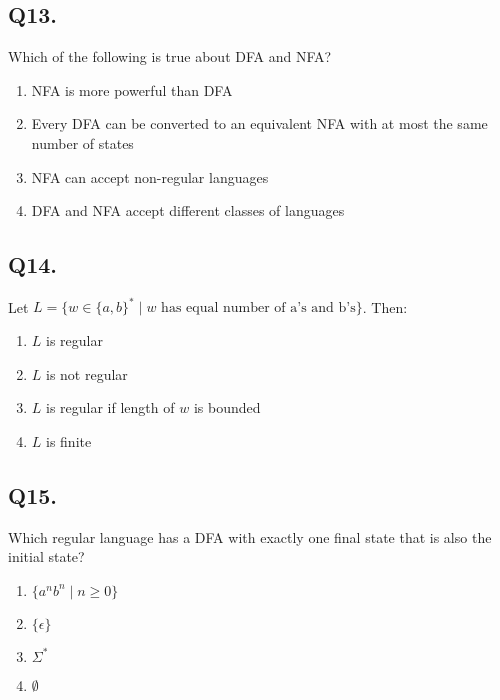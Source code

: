 \vspace{1em}

\subsection*{Q13.}
Which of the following is true about DFA and NFA?

\begin{enumerate}[label=(\alph*)]
    \item NFA is more powerful than DFA  
    \item Every DFA can be converted to an equivalent NFA with at most the same number of states  
    \item NFA can accept non-regular languages  
    \item DFA and NFA accept different classes of languages  
\end{enumerate}

\vspace{1em}

\subsection*{Q14.}
Let $L = \{w \in \{a, b\}^* \mid w \text{ has equal number of a's and b's} \}$. Then:

\begin{enumerate}[label=(\alph*)]
    \item $L$ is regular  
    \item $L$ is not regular  
    \item $L$ is regular if length of $w$ is bounded  
    \item $L$ is finite  
\end{enumerate}

\vspace{1em}

\subsection*{Q15.}
Which regular language has a DFA with exactly one final state that is also the initial state?

\begin{enumerate}[label=(\alph*)]
    \item $\{a^n b^n \mid n \geq 0\}$  
    \item $\{\epsilon\}$  
    \item $\Sigma^*$  
    \item $\emptyset$  
\end{enumerate}


